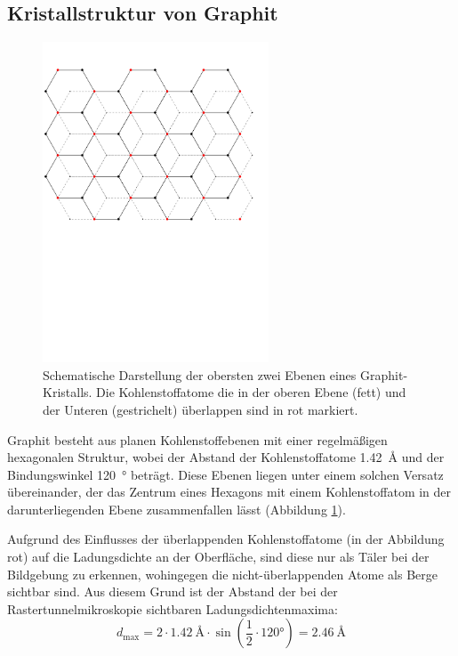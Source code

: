 \documentclass[10pt, a4paper]{article}
\begin{document}
\subsection{Kristallstruktur von Graphit}
\label{ssec:graphit}
\begin{figure}[h]
  \centering
  \includegraphics[width=0.6\textwidth]{grafiken/graphit.pdf}
  \caption{Schematische Darstellung der obersten zwei Ebenen eines Graphit-Kristalls. Die Kohlenstoffatome die in der oberen Ebene (fett) und der Unteren (gestrichelt) überlappen sind in rot markiert.}
  \label{fig:graphit}
\end{figure}
Graphit besteht aus planen Kohlenstoffebenen mit einer regelmäßigen hexagonalen Struktur, wobei der Abstand der Kohlenstoffatome \SI{1,42}{\angstrom} \cite{colton} und der Bindungswinkel \SI{120}{\degree} beträgt.
Diese Ebenen liegen unter einem solchen Versatz übereinander, der das Zentrum eines Hexagons mit einem Kohlenstoffatom in der darunterliegenden Ebene zusammenfallen lässt (Abbildung \ref{fig:graphit}).

Aufgrund des Einflusses der überlappenden Kohlenstoffatome (in der Abbildung rot) auf die Ladungsdichte an der Oberfläche, sind diese nur als Täler bei der Bildgebung zu erkennen, wohingegen die nicht-überlappenden Atome als Berge sichtbar sind.
Aus diesem Grund ist der Abstand der bei der Rastertunnelmikroskopie sichtbaren Ladungsdichtenmaxima:
\begin{equation*}
d_\mathrm{max} = 2 \cdot \SI{1,42}{\angstrom} \cdot \sin\left( \frac{1}{2} \cdot 120\si{\degree} \right) = \SI{2,46}{\angstrom}
\end{equation*}
\end{document}
